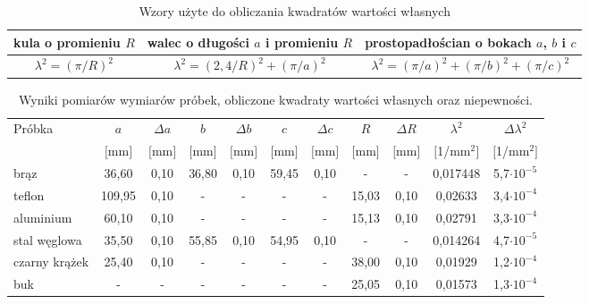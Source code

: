 \documentclass[11pt]{article}
\begin{document}
\begin{table}
\begin{center}\caption{Wzory użyte do obliczania kwadratów wartości własnych}{\label{ll}}
\begin{tabular}{|c|c|c|}\hline
kula o promieniu $R$ & walec o długości $a$ i promieniu $R$ & prostopadłościan o bokach $a$, $b$ i $c$ \\ \hline
\multirow{2}{*}{$\lambda^2= (\pi/R)^2$}&
\multirow{2}{*}{$\lambda^2= (2,4/R)^2+(\pi/a)^2$}&
\multirow{2}{*}{$\lambda^2= (\pi/a)^2+(\pi/b)^2+(\pi/c)^2$} \\ && \\ \hline
\end{tabular}
\end{center}
\end{table}

\begin{table}[h!]
\begin{center}
\caption{Wyniki pomiarów wymiarów próbek, obliczone kwadraty wartości własnych oraz niepewności. }{\label{tab}}
\begin{tabular}{|l|c|c|c|c|c|c|c|c|c|c|} \hline
\multirow{2}{*}{Próbka} & $a$ & $\Delta a$ & $b$ & $\Delta b$ & $c$ & $\Delta c$ & $R$ & $\Delta R$ & $\lambda^2$ & $\Delta\lambda^2$ \\ 
& $[$mm$]$ & $[$mm$]$& $[$mm$]$& $[$mm$]$& $[$mm$]$& $[$mm$]$& $[$mm$]$& $[$mm$]$ & $[$1/mm$^2]$ & $[$1/mm$^2]$\\ \hline
brąz &36,60&0,10& 36,80&0,10& 59,45&0,10& - & - & 0,017448& 5,7$\cdot 10^{-5}$\\ \hline   
teflon & 109,95 &0,10& -&-&-&-&15,03&0,10&0,02633 & 3,4$\cdot 10^{-4}$ \\ \hline
aluminium & 60,10 &0,10& -&-&-&-&15,13&0,10& 0,02791&3,3$\cdot 10^{-4}$\\ \hline
stal węglowa &35,50&0,10& 55,85&0,10& 54,95&0,10& - & - & 0,014264& 4,7$\cdot 10^{-5}$\\ \hline   
czarny krążek & 25,40 &0,10& -&-&-&-&38,00&0,10& 0,01929&1,2$\cdot 10^{-4}$\\ \hline
buk & -&-&-&-&-&-& 25,05 & 0,10 &0,01573& 1,3$\cdot 10^{-4}$\\ \hline
\end{tabular}
\end{center}
\end{table}
\end{document}
